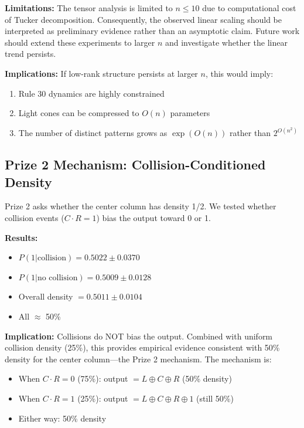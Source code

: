 \documentclass[11pt]{article}
\begin{document}
\textbf{Limitations:} The tensor analysis is limited to $n \leq 10$ due to computational cost of Tucker decomposition. Consequently, the observed linear scaling should be interpreted as preliminary evidence rather than an asymptotic claim. Future work should extend these experiments to larger $n$ and investigate whether the linear trend persists.

\textbf{Implications:} If low-rank structure persists at larger $n$, this would imply:
\begin{enumerate}
    \item Rule 30 dynamics are highly constrained
    \item Light cones can be compressed to $O(n)$ parameters
    \item The number of distinct patterns grows as $\exp(O(n))$ rather than $2^{O(n^2)}$
\end{enumerate}

\subsection{Prize 2 Mechanism: Collision-Conditioned Density}

Prize 2 asks whether the center column has density 1/2. We tested whether
collision events ($C \cdot R = 1$) bias the output toward 0 or 1.

\textbf{Results:}
\begin{itemize}
    \item $P(1|\text{collision}) = 0.5022 \pm 0.0370$
    \item $P(1|\text{no collision}) = 0.5009 \pm 0.0128$
    \item Overall density $= 0.5011 \pm 0.0104$
    \item All $\approx$ 50\%
\end{itemize}

\textbf{Implication:} Collisions do NOT bias the output. Combined with
uniform collision density (25\%), this provides empirical evidence consistent
with 50\% density for the center column---the Prize 2 mechanism. The mechanism is:
\begin{itemize}
    \item When $C \cdot R = 0$ (75\%): output $= L \oplus C \oplus R$ (50\% density)
    \item When $C \cdot R = 1$ (25\%): output $= L \oplus C \oplus R \oplus 1$ (still 50\%)
    \item Either way: 50\% density
\end{itemize}
\end{document}
